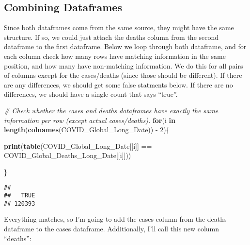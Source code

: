 \documentclass[]{tufte-handout}
\newenvironment{Shaded}{}{}
\newcommand{\CommentTok}[1]{\textcolor[rgb]{0.38,0.63,0.69}{\textit{#1}}}
\newcommand{\ControlFlowTok}[1]{\textcolor[rgb]{0.00,0.44,0.13}{\textbf{#1}}}
\newcommand{\DecValTok}[1]{\textcolor[rgb]{0.25,0.63,0.44}{#1}}
\newcommand{\KeywordTok}[1]{\textcolor[rgb]{0.00,0.44,0.13}{\textbf{#1}}}
\newcommand{\NormalTok}[1]{#1}
\newcommand{\OperatorTok}[1]{\textcolor[rgb]{0.40,0.40,0.40}{#1}}
\newcommand{\StringTok}[1]{\textcolor[rgb]{0.25,0.44,0.63}{#1}}
\begin{document}
\hypertarget{combining-dataframes}{%
\subsection{Combining Dataframes}\label{combining-dataframes}}

Since both dataframes come from the same source, they might have the
same structure. If so, we could just attach the deaths column from the
second dataframe to the first dataframe. Below we loop through both
dataframe, and for each column check how many rows have matching
information in the same position, and how many have non-matching
information. We do this for all pairs of columns except for the
cases/deaths (since those should be different). If there are any
differences, we should get some false statments below. If there are no
differences, we should have a single count that says ``true''.

\begin{Shaded}
\begin{Highlighting}[]
\CommentTok{# Check whether the cases and deaths dataframes have exactly the same information per row (except actual cases/deaths).}
\ControlFlowTok{for}\NormalTok{(i }\ControlFlowTok{in} \KeywordTok{length}\NormalTok{(}\KeywordTok{colnames}\NormalTok{(COVID_Global_Long_Date)) }\OperatorTok{-}\StringTok{ }\DecValTok{2}\NormalTok{)\{}
  
  \KeywordTok{print}\NormalTok{(}\KeywordTok{table}\NormalTok{(COVID_Global_Long_Date[[i]] }\OperatorTok{==}\StringTok{ }\NormalTok{COVID_Global_Deaths_Long_Date[[i]]))}
  
\NormalTok{\}}
\end{Highlighting}
\end{Shaded}

\begin{verbatim}
## 
##   TRUE 
## 120393
\end{verbatim}

Everything matches, so I'm going to add the cases column from the deaths
dataframe to the cases dataframe. Additionally, I'll call this new
column ``deaths'':

\begin{Shaded}
\end{Shaded}
\end{document}
